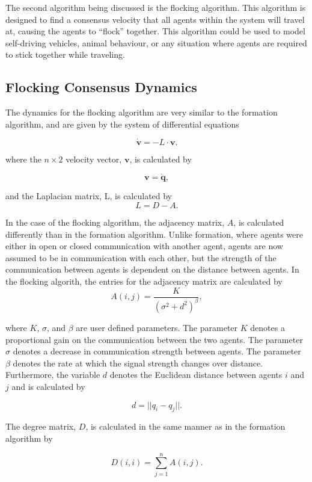 \documentclass[../CourseManual.tex]{subfiles}
\begin{document}
The second algorithm being discussed is the flocking algorithm. This algorithm is designed to find a consensus velocity that all agents within the system will travel at, causing the agents to “flock” together. This algorithm could be used to model self-driving vehicles, animal behaviour, or any situation where agents are required to stick together while traveling.

\subsection{Flocking Consensus Dynamics} \label{Flocking Consensus Dynamics}

The dynamics for the flocking algorithm are very similar to the formation algorithm, and are given by the system of differential equations

\[
\boldsymbol{\dot{v}} = - L \cdot \boldsymbol{v}.
\]

where the $n \times 2$ velocity vector, $\boldsymbol{v}$, is calculated by

\[
\boldsymbol{v} = \boldsymbol{\dot{q}},
\]

and the Laplacian matrix, L, is calculated by 
\[
L = D-A.
\]

In the case of the flocking algorithm, the adjacency matrix, $A$, is calculated differently than in the formation algorithm. Unlike formation, where agents were either in open or closed communication with another agent, agents are now assumed to be in communication with each other, but the strength of the communication between agents is dependent on the distance between agents. In the flocking algorith, the entries for the adjacency matrix are calculated by
\[
A(i,j) = \frac{K}{(\sigma^2+d^2)^\beta},
\]

where $K$, $\sigma$, and $\beta$ are user defined parameters. The parameter $K$ denotes a proportional gain on the communication between the two agents. The parameter $\sigma$ denotes a decrease in communication strength between agents. The parameter $\beta$ denotes the rate at which the signal strength changes over distance. Furthermore, the variable $d$ denotes the Euclidean distance between agents $i$ and $j$ and is calculated by

\[
d = ||q_i -q_j||. 
\]

The degree matrix, $D$, is calculated in the same manner as in the formation algorithm by

\[
D(i,i) = \sum_{j=1}^{n}{A(i,j)}.
\]
\end{document}
